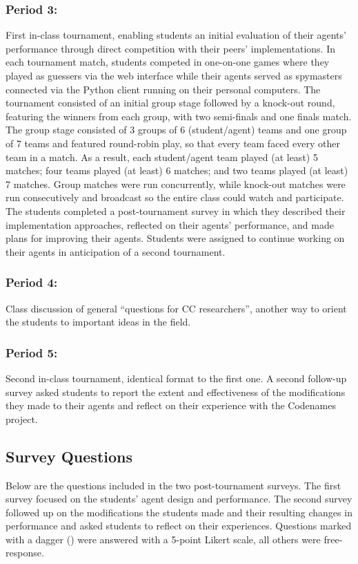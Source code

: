 \documentclass[phd,electronic,oneside,twosidetoc,letterpaper,chaptercenter,parttop,lof]{byumsphd}
\begin{document}
\subsubsection{Period 3:} First in-class tournament, enabling students an initial evaluation of their agents' performance through direct competition with their peers' implementations. In each tournament match, students competed in one-on-one games where they played as guessers via the web interface while their agents served as spymasters connected via the Python client running on their personal computers. The tournament consisted of an initial group stage followed by a knock-out round, featuring the winners from each group, with two semi-finals and one finals match.  The group stage consisted of  3 groups of 6 (student/agent) teams and one group of 7 teams and featured round-robin play, so that every team faced every other team in a match.  As a result, each student/agent team played (at least) 5 matches; four teams played (at least) 6 matches; and two teams played (at least) 7 matches.  Group matches were run concurrently, while knock-out matches were run consecutively and broadcast so the entire class could watch and participate. The students completed a post-tournament survey in which they described their implementation approaches, reflected on their agents' performance, and made plans for improving their agents. Students were assigned to continue working on their agents in anticipation of a second tournament.

\subsubsection{Period 4:} Class discussion of general “questions for CC researchers”, another way to orient the students to important ideas in the field.

\subsubsection{Period 5:} Second in-class tournament, identical format to the first one. A second follow-up survey asked students to report the extent and effectiveness of the modifications they made to their agents and reflect on their experience with the Codenames project.

\subsection{Survey Questions}
Below are the questions included in the two post-tournament surveys. The first survey focused on the students' agent design and performance. The second survey followed up on the modifications the students made and their resulting changes in performance and asked students to reflect on their experiences. Questions marked with a dagger (\textdagger) were answered with a 5-point Likert scale, all others were free-response.
\end{document}
